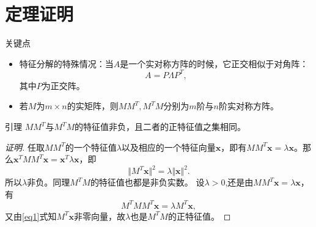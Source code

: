
\section{定理证明} 


\begin{frame}

\begin{block}{关键点}
\begin{itemize}
\item<2-> 特征分解的特殊情况：当$A$是一个实对称方阵的时候，它正交相似于对角阵：
$$A = P\Lambda P^T,$$
其中$P$为正交阵。
\vspace{1em}
\item<3-> 若$M$为$m\times n$的实矩阵，则$MM^T, M^TM$分别为$m$阶与$n$阶实对称方阵。
\end{itemize}
\end{block}

\end{frame}



\begin{frame}

\begin{block}{引理}
\centering
$MM^T$与$M^TM$的特征值非负，且二者的正特征值之集相同。
\end{block}

\pause

\begin{proof}[证明\nopunct]
任取$MM^T$的一个特征值$\lambda$以及相应的一个特征向量$\mathbf{x}$，即有$MM^T\mathbf{x} = \lambda\mathbf{x}$。那么$\mathbf{x}^TMM^T\mathbf{x} = \mathbf{x}^T\lambda\mathbf{x}$，即
\begin{equation}
\label{eq1}
\Vert M^T\mathbf{x} \Vert^2 = \lambda \Vert \mathbf{x} \Vert^2.
\end{equation}
所以$\lambda$非负。同理$M^TM$的特征值也都是非负实数。\newline\pause
设$\lambda > 0$,还是由$MM^T\mathbf{x} = \lambda\mathbf{x}$，有
\begin{equation}
\label{eq2}
M^TMM^T\mathbf{x} = \lambda M^T\mathbf{x},
\end{equation}
又由\eqref{eq1}式知$M^T\mathbf{x}$非零向量，故$\lambda$也是$M^TM$的正特征值。
\end{proof}

\end{frame}

